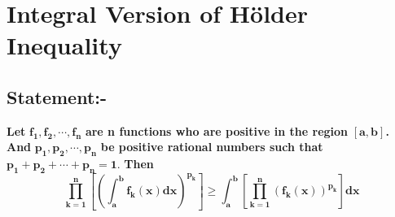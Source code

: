 \documentclass[12pt]{article}
\begin{document}
\color{black}
\pagebreak

\vspace*{0.35cm}
\section{Integral Version of H\"{o}lder  Inequality}
\subsection{Statement:-}
\textbf{Let }$\boldsymbol{ f_1,f_2,\cdots, f_n}$\textbf{ are n functions who are positive in the region }$\boldsymbol{[a,b] }$\textbf{. And }$\boldsymbol{p_1, p_2, \cdots,p_n}$\textbf{ be positive rational numbers such that   }$\boldsymbol{p_1+p_2+\cdots+p_n=1 .}$\textbf{ Then}$$\boldsymbol{\prod_{k=1}^n \left[\left(\int_a^b f_k (x)dx \right)^{p_k}\right]\geq \int_a^b\left[ \prod_{k=1}^n\left(f_k (x)\right)^{p_k}\right]dx}$$
\end{document}
